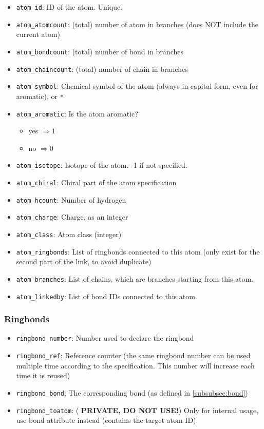 \documentclass[a4paper, 11pt]{article}
\begin{document}
\begin{itemize}
    \item \texttt{atom\_id}: ID of the atom. Unique.
    \item \texttt{atom\_atomcount}: (total) number of atom in branches (does NOT include the current atom)
    \item \texttt{atom\_bondcount}: (total) number of bond in branches
    \item \texttt{atom\_chaincount}: (total) number of chain in branches
    \item \texttt{atom\_symbol}: Chemical symbol of the atom (always in capital form, even for aromatic), or \texttt{*}
    \item \texttt{atom\_aromatic}: Is the atom aromatic?
    \begin{itemize}
        \item yes $\Rightarrow 1$
        \item no $\Rightarrow 0$
    \end{itemize}
    \item \texttt{atom\_isotope}: Isotope of the atom. -1 if not specified.
    \item \texttt{atom\_chiral}: Chiral part of the atom specification
    \item \texttt{atom\_hcount}: Number of hydrogen
    \item \texttt{atom\_charge}: Charge, as an integer
    \item \texttt{atom\_class}: Atom class (integer)
    \item \texttt{atom\_ringbonds}: List of ringbonds connected to this atom (only exist for the second part of the link, to avoid duplicate)
    \item \texttt{atom\_branches}: List of chains, which are branches starting from this atom.
    \item \texttt{atom\_linkedby}: List of bond IDs connected to this atom.
\end{itemize}

\subsubsection{Ringbonds}

\begin{itemize}
    \item \texttt{ringbond\_number}: Number used to declare the ringbond
    \item \texttt{ringbond\_ref}: Reference counter (the same ringbond number can be used multiple time according to the specification. This number will increase each time it is reused)
    \item \texttt{ringbond\_bond}: The corresponding bond (as defined in \ref{subsubsec:bond})
    \item \texttt{ringbond\_toatom}: (\textbf{\color{red} PRIVATE, DO NOT USE!}) Only for internal usage, use bond attribute instead (contains the target atom ID).
\end{itemize}
\end{document}

